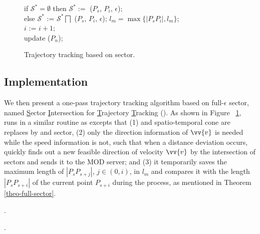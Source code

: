 \begin{figure}[tb!]
\begin{center}
{\begin{minipage}{3.3in}
{					\icc \>\hspace{3ex} if $\mathcal{S}^*=\emptyset$ then $\mathcal{S}^*:=$ ($P_s$, $P_{i}$, $\epsilon$); \\
					\icc \>\hspace{3ex} else $\mathcal{S}^*$ := $\mathcal{S}^*\bigsqcap$ ($P_s$, $P_{i}$, $\epsilon$); $l_{m} = \max\{|P_sP_{i}|, l_{m}\}$;\\
					\icc \>\hspace{3ex} $i$ := $i +1$;\\
					\icc \>\hspace{0ex} update ($P_{n}$); 
				}
				\vspace{-2ex}
				\myhrule
			\end{minipage}
		}
	\end{center}
	\vspace{-1ex}
	\caption{\small Trajectory tracking based on sector.}
	\label{alg:sitt}
	\vspace{-1ex}
\end{figure}

\subsection{Implementation}

We then present a one-pass trajectory tracking algorithm based on full-$\epsilon$ sector, named \underline{S}ector \underline{I}ntersection for \underline{T}rajectory \underline{T}racking (\sitt). As shown in Figure ~\ref{alg:sitt}, \sitt runs in a similar routine as \citt excepts that (1) \sed and spatio-temporal cone are replaces by \ped and sector, (2) only the direction information of $\vv{v}$ is needed while the speed information is not, such that when a distance deviation occurs, \sitt quickly finds out a new feasible direction of velocity $\vv{v}$ by the intersection of sectors and sends it to the MOD server; and (3) it temporarily saves the maximum length of $|P_sP_{s+j}|$, $j\in (0, i)$, in $l_m$ and compares it with the length $|P_sP_{s+i}|$ of the current point $P_{s+i}$ during the process, as mentioned in Theorem \ref{theo-full-sector}. 


\begin{example}
	\todo.
\end{example}


\todo.


